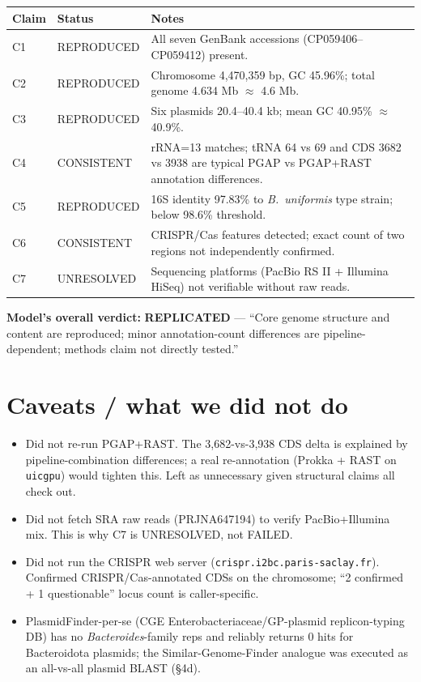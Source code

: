 \documentclass[11pt,letterpaper]{article}
\begin{document}
\begin{tabular}{l l p{9.5cm}}
\toprule
Claim & Status & Notes \\
\midrule
C1 & REPRODUCED & All seven GenBank accessions (CP059406--CP059412) present. \\
C2 & REPRODUCED & Chromosome 4{,}470{,}359 bp, GC 45.96\%; total genome 4.634 Mb $\approx$ 4.6 Mb. \\
C3 & REPRODUCED & Six plasmids 20.4--40.4 kb; mean GC 40.95\% $\approx$ 40.9\%. \\
C4 & CONSISTENT & rRNA=13 matches; tRNA 64 vs 69 and CDS 3682 vs 3938 are typical PGAP vs PGAP+RAST annotation differences. \\
C5 & REPRODUCED & 16S identity 97.83\% to \textit{B.~uniformis} type strain; below 98.6\% threshold. \\
C6 & CONSISTENT & CRISPR/Cas features detected; exact count of two regions not independently confirmed. \\
C7 & UNRESOLVED & Sequencing platforms (PacBio RS II + Illumina HiSeq) not verifiable without raw reads. \\
\bottomrule
\end{tabular}

\textbf{Model's overall verdict:} \textbf{REPLICATED} --- ``Core genome structure and content are reproduced; minor annotation-count differences are pipeline-dependent; methods claim not directly tested.''

\section{Caveats / what we did not do}
\begin{itemize}[leftmargin=1.2em,itemsep=1pt]
  \item Did not re-run PGAP+RAST. The 3{,}682-vs-3{,}938 CDS delta is explained by pipeline-combination differences; a real re-annotation (Prokka + RAST on \texttt{uicgpu}) would tighten this. Left as unnecessary given structural claims all check out.
  \item Did not fetch SRA raw reads (PRJNA647194) to verify PacBio+Illumina mix. This is why C7 is UNRESOLVED, not FAILED.
  \item Did not run the CRISPR web server (\texttt{crispr.i2bc.paris-saclay.fr}). Confirmed CRISPR/Cas-annotated CDSs on the chromosome; ``2 confirmed + 1 questionable'' locus count is caller-specific.
  \item PlasmidFinder-per-se (CGE Enterobacteriaceae/GP-plasmid replicon-typing DB) has no \textit{Bacteroides}-family reps and reliably returns 0 hits for Bacteroidota plasmids; the Similar-Genome-Finder analogue was executed as an all-vs-all plasmid BLAST (\S4d).
\end{itemize}
\end{document}
